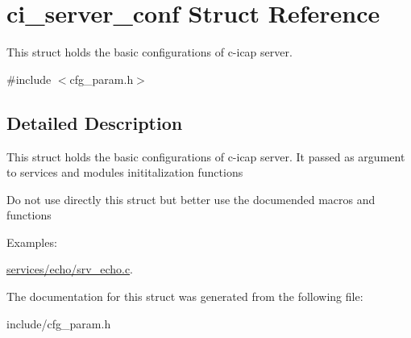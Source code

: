 \hypertarget{structci__server__conf}{
\section{ci\_\-server\_\-conf Struct Reference}
\label{structci__server__conf}
}


This struct holds the basic configurations of c-\/icap server.  


{\ttfamily \#include $<$cfg\_\-param.h$>$}

\subsection{Detailed Description}
This struct holds the basic configurations of c-\/icap server. It passed as argument to services and modules inititalization functions

Do not use directly this struct but better use the documended macros and functions \begin{Desc}
\item[Examples: ]\par


\hyperlink{services_2echo_2srv__echo_8c-example}{services/echo/srv\_\-echo.c}.\end{Desc}


The documentation for this struct was generated from the following file:\begin{DoxyCompactItemize}
\item 
include/cfg\_\-param.h\end{DoxyCompactItemize}
